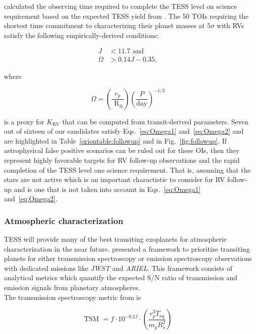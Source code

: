 \cite{cloutier18b} calculated the observing time required to complete the TESS level on science requirement
based on the expected TESS yield from \cite{sullivan15}. The 50 TOIs requiring the shortest time
commitment to characterizing their planet masses at $5\sigma$ with RVs satisfy the following empirically-derived
conditions: 

\begin{align}
  J &< 11.7 \text{ and} \label{eq:Omega1} \\
  \Omega &> 0.14J - 0.35, \label{eq:Omega2}
\end{align}

\noindent where

\begin{equation}
\Omega = \left( \frac{r_p}{\text{ R}_{\oplus}} \right) \left( \frac{P}{\text{day}}  \right)^{-1/3}
\end{equation}

\noindent is a proxy for $K_{\text{RV}}$ that can be computed from transit-derived parameters.
Seven out of sixteen of our candidates satisfy Eqs.~\ref{eq:Omega1} and~\ref{eq:Omega2} and are highlighted
in Table~\ref{oriontable:followup} and in Fig.~\ref{fig:followup}.
If astrophysical false positive scenarios can be ruled out for these OIs, then
they represent highly favorable targets for RV follow-up observations and the rapid completion of the
TESS level one science requirement. That is, assuming that the stars are not active which is an
important charactistic to consider for RV follow-up \citep{moutou17} and is one that is not taken into
account in Eqs.~\ref{eq:Omega1} and~\ref{eq:Omega2}.

\subsubsection{Atmospheric characterization} \label{sect:atmospheres}
TESS will provide many of the best transiting exoplanets for atmospheric characterization in the
near future. \cite{kempton18} presented a framework to prioritize transiting planets for
either transmission spectroscopy or emission spectroscopy observations with dedicated missions
like \emph{JWST} and \emph{ARIEL}. This framework consists of analytical metrics which quantify
the expected S/N ratio of transmission and emission signals from planetary atmospheres. \\

The transmission spectroscopy metric from \cite{kempton18} is

\begin{equation}
  \text{TSM } = f \cdot 10^{-0.2J} \cdot \left( \frac{r_p^3 T_{\text{eq}}}{m_p R_s^2} \right)
  \label{eq:tsm}
\end{equation}

